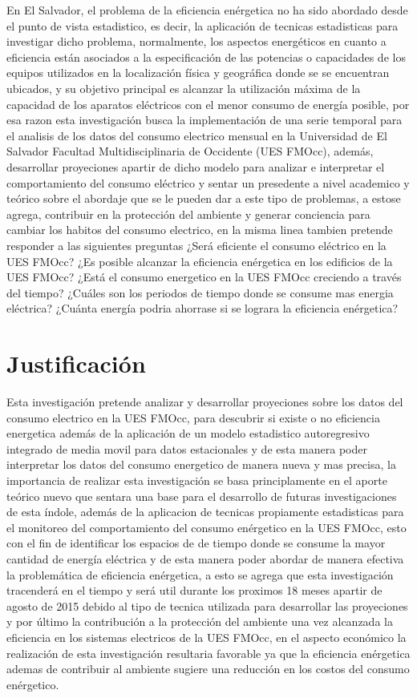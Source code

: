 \documentclass[12pt,letterpaper]{report}
\begin{document}
En El Salvador, el problema de la eficiencia enérgetica no ha sido abordado desde el punto de vista estadistico, es decir, la aplicación de tecnicas estadisticas para investigar dicho problema,
normalmente, los aspectos energéticos en cuanto a eficiencia están asociados a la especificación de
las potencias o capacidades de los equipos utilizados en la localización física y geográfica
donde se se encuentran ubicados, y su objetivo principal es alcanzar la utilización máxima de la
capacidad de los aparatos eléctricos con el menor consumo de energía posible, por esa razon esta investigación busca la implementación de una serie temporal para el analisis de los datos del consumo electrico mensual en la Universidad de El Salvador Facultad Multidisciplinaria de Occidente (UES FMOcc), además, desarrollar proyeciones apartir de dicho modelo para analizar e interpretar el comportamiento del consumo eléctrico y sentar un presedente a nivel academico y teórico sobre el abordaje que se le pueden dar a este tipo de problemas, a estose agrega, contribuir en la protección del ambiente y generar conciencia para cambiar los habitos del consumo electrico, en la misma linea tambien pretende responder a las siguientes preguntas ¿Será eficiente el consumo eléctrico en la UES FMOcc? ¿Es posible alcanzar la eficiencia enérgetica en los edificios de la UES FMOcc? ¿Está el consumo energetico en la UES FMOcc creciendo a través del tiempo? ¿Cuáles son los periodos de tiempo donde se consume mas energia eléctrica? ¿Cuánta energía podria ahorrase si se lograra la eficiencia enérgetica?

\newpage
\section{Justificación}
Esta investigación pretende analizar y desarrollar proyeciones sobre los datos del consumo electrico en la UES FMOcc, para descubrir si existe o no eficiencia energetica además de la aplicación de un modelo estadistico autoregresivo integrado de media movil para datos estacionales y de esta manera poder interpretar los datos del consumo energetico de manera nueva y mas precisa, la importancia de realizar esta investigación se basa principlamente en el aporte teórico nuevo que sentara una base para el desarrollo de futuras investigaciones de esta índole, además de la aplicacion de tecnicas propiamente estadisticas para el monitoreo del comportamiento del consumo enérgetico en la UES FMOcc, esto con el fin de identificar los espacios de de tiempo donde se consume la mayor cantidad de energía eléctrica y de esta manera poder abordar de manera efectiva la problemática de eficiencia enérgetica, a esto se agrega que esta investigación tracenderá en el tiempo y será util durante los proximos 18 meses apartir de agosto de 2015 debido al tipo de tecnica utilizada para desarrollar las proyeciones y por último la contribución a la protección del ambiente una vez alcanzada la eficiencia en los sistemas electricos de la UES FMOcc, en el aspecto económico la realización de esta investigación resultaria favorable ya que la eficiencia enérgetica ademas de contribuir al ambiente sugiere una reducción en los costos del consumo enérgetico. 
\end{document}
